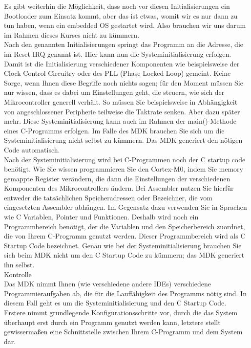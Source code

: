 Es gibt weiterhin die Möglichkeit, dass noch vor diesen Initialisierungen ein Bootloader zum Einsatz kommt, aber das ist etwas, womit wir es nur dann zu tun haben, wenn ein embedded OS gestartet wird. Also brauchen wir uns darum im Rahmen dieses Kurses nicht zu kümmern.\\

Nach den genannten Initialisierungen springt das Programm an die Adresse, die im Reset IRQ genannt ist. Hier kann nun die Systeminitialisierung erfolgen. Damit ist die Initialisierung verschiedener Komponenten wie beispielsweise der Clock Control Circuitry oder des PLL (Phase Locked Loop) gemeint. Keine Sorge, wenn Ihnen diese Begriffe noch nichts sagen; für den Moment müssen Sie nur wissen, dass es dabei um Einstellungen geht, die steuern, wie sich der Mikrocontroller generell verhält. So müssen Sie beispielsweise in Abhängigkeit von angeschlossener Peripherie teilweise die Taktrate senken. Aber dazu später mehr. Diese Systeminitialisierung kann auch im Rahmen der main()-Methode eines C-Programms erfolgen. Im Falle des MDK brauchen Sie sich um die Systeminitialisierung nicht selbst zu kümmern. Das MDK generiert den nötigen Code automatisch.\\

Nach der Systeminitialisierung wird bei C-Programmen noch der C startup code benötigt. Wie Sie wissen programmieren Sie den Cortex-M0, indem Sie memory gemappte Register verändern, die dann die Einstellungen der verschiedenen Komponenten des Mikrocontrollers ändern. Bei Assembler nutzen Sie hierfür entweder die tatsächlichen Speicheradressen oder Bezeichner, die vom eingesetzten Assembler abhängen. Im Gegensatz dazu verwenden Sie in Sprachen wie C Variablen, Pointer und Funktionen. Deshalb wird noch ein Programmbereich benötigt, der die Variablen und den Speicherbereich zuordnet, die von Ihrem C-Programm genutzt werden. Dieser Programmbereich wird als C Startup Code bezeichnet. Genau wie bei der Systeminitialisierung brauchen Sie sich beim MDK nicht um den C Startup Code zu kümmern; das MDK generiert ihn selbst.\\

Kontrolle\\

Das MDK nimmt Ihnen (wie verschiedene andere IDEs) verschiedene Programmieraufgaben ab, die für die Lauffähigkeit des Programms nötig sind. In diesem Fall geht es um die Systeminitialisierung und den C Startup Code.\\

Erstere nimmt grundlegende Konfigurationsschritte vor, durch die das System überhaupt erst durch ein Programm genutzt werden kann, letztere stellt gewissermaßen eine Schnittstelle zwischen Ihrem C-Programm und dem System dar.\\

